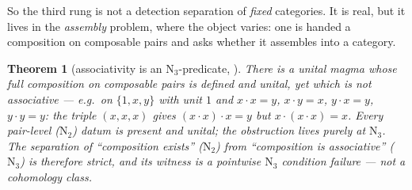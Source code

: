\documentclass[11pt]{article}
\newtheorem{theorem}{Theorem}
\theoremstyle{definition}
\newcommand{\Nerve}{\mathrm{N}}
\begin{document}
So the third rung is not a detection separation of \emph{fixed} categories. It is real, but it lives
in the \emph{assembly} problem, where the object varies: one is handed a composition on composable
pairs and asks whether it assembles into a category.

\begin{theorem}[associativity is an $\Nerve_3$-predicate, \cite{MacBethNerve}]\label{thm:assembly}
There is a unital magma whose full composition on composable pairs is defined and unital, yet which is
not associative --- e.g.\ on $\{1,x,y\}$ with unit $1$ and $x\cdot x=y$, $x\cdot y=x$, $y\cdot x=y$,
$y\cdot y=y$: the triple $(x,x,x)$ gives $(x\cdot x)\cdot x=y$ but $x\cdot(x\cdot x)=x$. Every pair-level
($\Nerve_2$) datum is present and unital; the obstruction lives purely at $\Nerve_3$. The separation of
``composition exists'' ($\Nerve_2$) from ``composition is associative'' ($\Nerve_3$) is therefore
strict, and its witness is a pointwise $\Nerve_3$ condition failure --- not a cohomology class.
\end{theorem}
\end{document}
